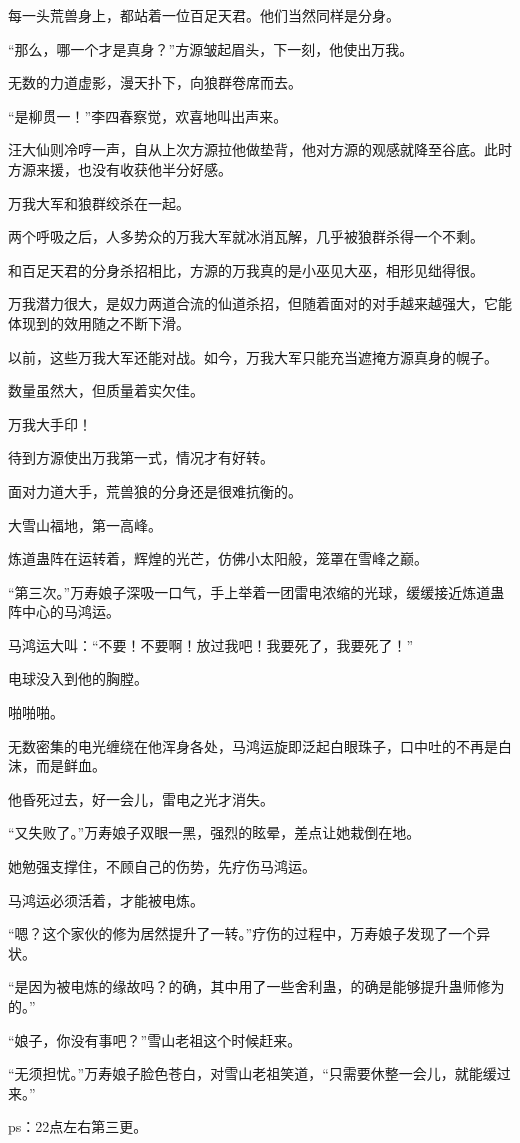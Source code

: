 \begin{this_body}
每一头荒兽身上，都站着一位百足天君。他们当然同样是分身。

“那么，哪一个才是真身？”方源皱起眉头，下一刻，他使出万我。

无数的力道虚影，漫天扑下，向狼群卷席而去。

“是柳贯一！”李四春察觉，欢喜地叫出声来。

汪大仙则冷哼一声，自从上次方源拉他做垫背，他对方源的观感就降至谷底。此时方源来援，也没有收获他半分好感。

万我大军和狼群绞杀在一起。

两个呼吸之后，人多势众的万我大军就冰消瓦解，几乎被狼群杀得一个不剩。

和百足天君的分身杀招相比，方源的万我真的是小巫见大巫，相形见绌得很。

万我潜力很大，是奴力两道合流的仙道杀招，但随着面对的对手越来越强大，它能体现到的效用随之不断下滑。

以前，这些万我大军还能对战。如今，万我大军只能充当遮掩方源真身的幌子。

数量虽然大，但质量着实欠佳。

万我大手印！

待到方源使出万我第一式，情况才有好转。

面对力道大手，荒兽狼的分身还是很难抗衡的。

大雪山福地，第一高峰。

炼道蛊阵在运转着，辉煌的光芒，仿佛小太阳般，笼罩在雪峰之巅。

“第三次。”万寿娘子深吸一口气，手上举着一团雷电浓缩的光球，缓缓接近炼道蛊阵中心的马鸿运。

马鸿运大叫：“不要！不要啊！放过我吧！我要死了，我要死了！”

电球没入到他的胸膛。

啪啪啪。

无数密集的电光缠绕在他浑身各处，马鸿运旋即泛起白眼珠子，口中吐的不再是白沫，而是鲜血。

他昏死过去，好一会儿，雷电之光才消失。

“又失败了。”万寿娘子双眼一黑，强烈的眩晕，差点让她栽倒在地。

她勉强支撑住，不顾自己的伤势，先疗伤马鸿运。

马鸿运必须活着，才能被电炼。

“嗯？这个家伙的修为居然提升了一转。”疗伤的过程中，万寿娘子发现了一个异状。

“是因为被电炼的缘故吗？的确，其中用了一些舍利蛊，的确是能够提升蛊师修为的。”

“娘子，你没有事吧？”雪山老祖这个时候赶来。

“无须担忧。”万寿娘子脸色苍白，对雪山老祖笑道，“只需要休整一会儿，就能缓过来。”

ps：22点左右第三更。

\end{this_body}

